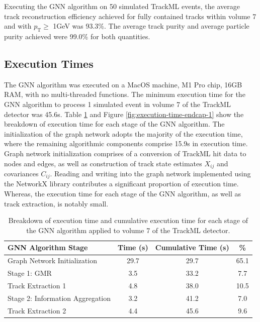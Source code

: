Executing the GNN algorithm on 50 simulated TrackML events, the average track reconstruction efficiency achieved for fully contained tracks within volume 7 and with $p_{\text{T}} \geq$ 1GeV was 93.3\%. The average track purity and average particle purity achieved were 99.0\% for both quantities.








\subsection{Execution Times}

The GNN algorithm was executed on a MacOS machine, M1 Pro chip, 16GB RAM, with no multi-threaded functions. The minimum execution time for the GNN algorithm to process 1 simulated event in volume 7 of the TrackML detector was 45.6s. Table \ref{tab:trackml-endcap-execution-times} and Figure \ref{fig:execution-time-endcap-1} show the breakdown of execution time for each stage of the GNN algorithm. The initialization of the graph network adopts the majority of the execution time, where the remaining algorithmic components comprise 15.9s in execution time. Graph network initialization comprises of a conversion of TrackML hit data to nodes and edges, as well as construction of track state estimates $X_{ij}$ and covariances $C_{ij}$. Reading and writing into the graph network implemented using the NetworkX library contributes a significant proportion of execution time. Whereas, the execution time for each stage of the GNN algorithm, as well as track extraction, is notably small.

\begin{table}[!htbp]
\caption{Breakdown of execution time and cumulative execution time for each stage of the GNN algorithm applied to volume 7 of the TrackML detector.}
\begin{center}
\begin{tabular}{lccc}
\toprule
GNN Algorithm Stage & Time (s) & Cumulative Time (s) & \% \\
\hline
Graph Network Initialization    & 29.7  & 29.7  &  65.1    \\
Stage 1: GMR                    & 3.5   & 33.2   &  7.7    \\
Track Extraction 1              & 4.8   & 38.0   &  10.5    \\
Stage 2: Information Aggregation & 3.2   & 41.2   &  7.0    \\
Track Extraction 2              & 4.4   & 45.6   &  9.6    \\
\bottomrule
\end{tabular}
\end{center}
\label{tab:trackml-endcap-execution-times}
\end{table}

